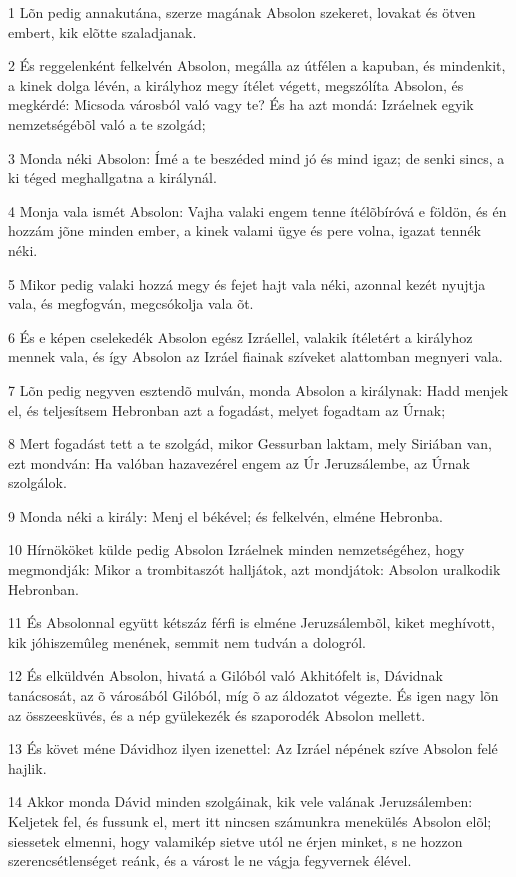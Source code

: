 \par 1 Lõn pedig annakutána, szerze magának Absolon szekeret, lovakat és ötven embert, kik elõtte szaladjanak.
\par 2 És reggelenként felkelvén Absolon, megálla az útfélen a kapuban, és mindenkit, a kinek dolga lévén, a királyhoz megy ítélet végett, megszólíta Absolon, és megkérdé: Micsoda városból való vagy te? És ha azt mondá: Izráelnek egyik nemzetségébõl való a te szolgád;
\par 3 Monda néki Absolon: Ímé a te beszéded mind jó és mind igaz; de senki sincs, a ki téged meghallgatna a királynál.
\par 4 Monja vala ismét Absolon: Vajha valaki engem tenne ítélõbíróvá e földön, és én hozzám jõne minden ember, a kinek valami ügye és pere volna, igazat tennék néki.
\par 5 Mikor pedig valaki hozzá megy és fejet hajt vala néki, azonnal kezét nyujtja vala, és megfogván, megcsókolja vala õt.
\par 6 És e képen cselekedék Absolon egész Izráellel, valakik ítéletért a királyhoz mennek vala, és így Absolon az Izráel fiainak szíveket alattomban megnyeri vala.
\par 7 Lõn pedig negyven esztendõ mulván, monda Absolon a királynak: Hadd menjek el, és teljesítsem Hebronban azt a fogadást, melyet fogadtam az Úrnak;
\par 8 Mert fogadást tett a te szolgád, mikor Gessurban laktam, mely Siriában van, ezt mondván: Ha valóban hazavezérel engem az Úr Jeruzsálembe, az Úrnak szolgálok.
\par 9 Monda néki a király: Menj el békével; és felkelvén, elméne Hebronba.
\par 10 Hírnököket külde pedig Absolon Izráelnek minden nemzetségéhez, hogy megmondják: Mikor a trombitaszót halljátok, azt mondjátok: Absolon uralkodik Hebronban.
\par 11 És Absolonnal együtt kétszáz férfi is elméne Jeruzsálembõl, kiket meghívott, kik jóhiszemûleg menének, semmit nem tudván a dologról.
\par 12 És elküldvén Absolon, hivatá a Gilóból való Akhitófelt is, Dávidnak tanácsosát, az õ városából Gilóból, míg õ az áldozatot végezte. És igen nagy lõn az összeesküvés, és a nép gyülekezék és szaporodék Absolon mellett.
\par 13 És követ méne Dávidhoz ilyen izenettel: Az Izráel népének szíve Absolon felé hajlik.
\par 14 Akkor monda Dávid minden szolgáinak, kik vele valának Jeruzsálemben: Keljetek fel, és fussunk el, mert itt nincsen számunkra menekülés Absolon elõl; siessetek elmenni, hogy valamikép sietve utól ne érjen minket, s ne hozzon szerencsétlenséget reánk, és a várost le ne vágja fegyvernek élével.
